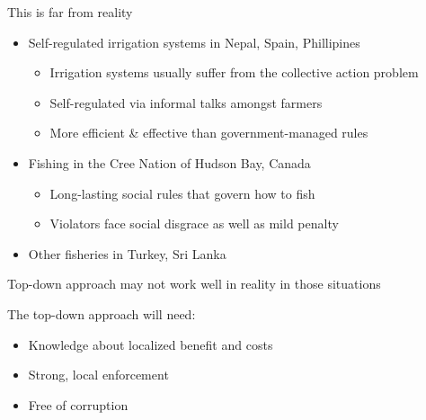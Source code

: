 \begin{frame}{This is far from reality}
\protect\hypertarget{this-is-far-from-reality}{}

\begin{itemize}
\tightlist
\item
  Self-regulated irrigation systems in Nepal, Spain, Phillipines

  \begin{itemize}
  \tightlist
  \item
    Irrigation systems usually suffer from the collective action problem
  \item
    Self-regulated via informal talks amongst farmers
  \item
    More efficient \& effective than government-managed rules
  \end{itemize}
\end{itemize}

\end{frame}

\begin{frame}{}
\protect\hypertarget{section-38}{}

\begin{itemize}
\tightlist
\item
  Fishing in the Cree Nation of Hudson Bay, Canada

  \begin{itemize}
  \tightlist
  \item
    Long-lasting social rules that govern how to fish
  \item
    Violators face social disgrace as well as mild penalty
  \end{itemize}
\item
  Other fisheries in Turkey, Sri Lanka
\end{itemize}

\end{frame}

\begin{frame}{Top-down approach may not work well in reality in those
situations}
\protect\hypertarget{top-down-approach-may-not-work-well-in-reality-in-those-situations}{}

The top-down approach will need:

\begin{itemize}
\tightlist
\item
  Knowledge about localized benefit and costs
\item
  Strong, local enforcement
\item
  Free of corruption
\end{itemize}

\end{frame}

